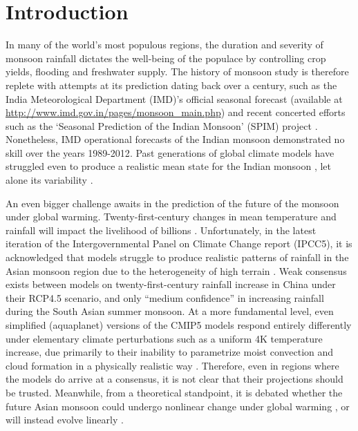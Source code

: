 \section{Introduction}

	In many of the world's most populous regions, the duration and severity of monsoon rainfall dictates the well-being of the populace by controlling crop yields, flooding and freshwater supply. The history of monsoon study is therefore replete with attempts at its prediction dating back over a century, such as the India Meteorological Department (IMD)'s official seasonal forecast (available at \url{http://www.imd.gov.in/pages/monsoon_main.php}) and recent concerted efforts such as the `Seasonal Prediction of the Indian Monsoon' (SPIM) project \citep{Gadgil2011}. Nonetheless, IMD operational forecasts of the Indian monsoon demonstrated no skill over the years 1989-2012\cite{Wang2015}. Past generations of global climate models have struggled even to produce a realistic mean state for the Indian monsoon \citep{Gadgil2003}, let alone its variability \citep{KrishnaKumar2005}. 
	
	An even bigger challenge awaits in the prediction of the future of the monsoon under global warming. Twenty-first-century changes in mean temperature and rainfall will impact the livelihood of billions \citep{Barrios2010,Burke2015}. Unfortunately, in the latest iteration of the Intergovernmental Panel on Climate Change report (IPCC5), it is acknowledged that models struggle to produce realistic patterns of rainfall in the Asian monsoon region due to the heterogeneity of high terrain \citep{Christensen2011}. Weak consensus exists between models on twenty-first-century rainfall increase in China under their RCP4.5 scenario, and only ``medium confidence'' in increasing rainfall during the South Asian summer monsoon. At a more fundamental level, even simplified (aquaplanet) versions of the CMIP5 models respond entirely differently under elementary climate perturbations such as a uniform 4K temperature increase, due primarily to their inability to parametrize moist convection and cloud formation in a physically realistic way \citep{Stevens2013}. Therefore, even in regions where the models do arrive at a consensus, it is not clear that their projections should be trusted. Meanwhile, from a theoretical standpoint, it is debated whether the future Asian monsoon could undergo nonlinear change under global warming \citep{Zickfeld2005}, or will instead evolve linearly \citep{Boos2016}.
	
